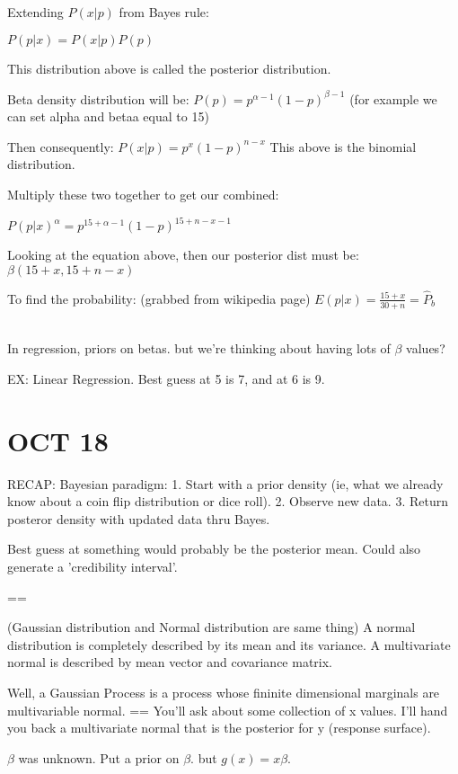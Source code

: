 \documentclass[12pt]{article}
\begin{document}
Extending $P(x|p)$ from Bayes rule: 

$P(p|x) = P(x|p)P(p)$

This distribution above is called the posterior distribution.

Beta density distribution will be:
$P(p) = p^{\alpha-1}(1-p)^{\beta-1}$
(for example we can set alpha and betaa equal to 15)

Then consequently:
$P(x|p) = p^x(1-p)^{n-x}$
This above is the binomial distribution.

Multiply these two together to get our combined:

$P(p|x)^\alpha = p^{15+\alpha -1}(1-p)^{15+n-x-1}$

Looking at the equation above, then our posterior dist must be: $\beta (15+x, 15+n-x)$

To find the probability: (grabbed from wikipedia page)
$E(p|x) = \frac{15+x}{30+n} = \hat{P}_b$  \\\

In regression, priors on betas. but we're thinking about having lots of $\beta$ values? 

EX: Linear Regression. Best guess at 5 is 7, and at 6 is 9.



\section{OCT 18}
RECAP:
Bayesian paradigm:
1. Start with a prior density (ie, what we already know about a coin flip distribution or dice roll).
2. Observe new data.
3. Return posteror density with updated data thru Bayes.

Best guess at something would probably be the posterior mean. Could also generate a 'credibility interval'. 

==

(Gaussian distribution and Normal distribution are same thing)
A normal distribution is completely described by its mean and its variance.
A multivariate normal is described by mean vector and covariance matrix.

Well, a Gaussian Process is a process whose fininite dimensional marginals are multivariable normal.
==
You'll ask about some collection of x values. I'll hand you back a multivariate normal that is the posterior for y (response surface).

$\beta$ was unknown. Put a prior on $\beta$. but $g(x) = x\beta$.
\end{document}

